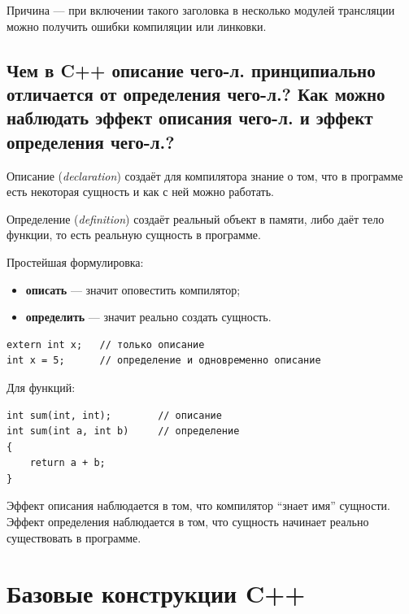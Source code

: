 Причина --- при включении такого заголовка в несколько модулей трансляции можно получить ошибки компиляции или линковки.


\subsection{Чем в C++ описание чего-л. принципиально отличается от определения чего-л.? Как можно наблюдать эффект описания чего-л. и эффект определения чего-л.?}

\begin{definition}[Описание]
Описание (\textit{declaration}) создаёт для компилятора знание о том, что в программе есть некоторая сущность и как с ней можно работать.
\end{definition}

\begin{definition}[Определение]
Определение (\textit{definition}) создаёт реальный объект в памяти, либо даёт тело функции, то есть реальную сущность в программе.
\end{definition}

Простейшая формулировка:
\begin{itemize}
    \item \textbf{описать} --- значит оповестить компилятор;
    \item \textbf{определить} --- значит реально создать сущность.
\end{itemize}

\begin{example}
\begin{verbatim}
extern int x;   // только описание
int x = 5;      // определение и одновременно описание
\end{verbatim}
\end{example}

Для функций:
\begin{verbatim}
int sum(int, int);        // описание
int sum(int a, int b)     // определение
{
    return a + b;
}
\end{verbatim}

Эффект описания наблюдается в том, что компилятор ``знает имя'' сущности. Эффект определения наблюдается в том, что сущность начинает реально существовать в программе.



\section{Базовые конструкции C++}

